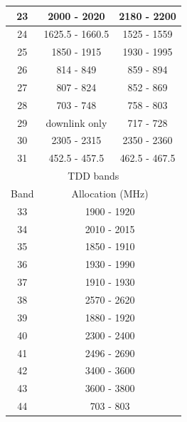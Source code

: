 \begin{table}[H]
\begin{tabular}{|c|c|c|}
         23 & 2000 - 2020 & 2180 - 2200 \\
         \hline
         24 & 1625.5 - 1660.5 & 1525 - 1559\\
         \hline
         25 & 1850 - 1915 & 1930 - 1995\\
         \hline
         26 & 814 - 849 & 859 - 894\\
         \hline
         27 & 807 - 824 & 852 - 869\\
         \hline
         28 & 703 - 748 & 758 - 803\\
         \hline
         29 & downlink only & 717 - 728 \\
         \hline
         30 & 2305 - 2315 & 2350 - 2360\\
         \hline
         31 & 452.5 - 457.5 & 462.5 - 467.5\\
         \hline
         \hline
         \multicolumn{3}{|c|}{TDD bands} \\
         \hline
         Band & \multicolumn{2}{|c|}{Allocation (MHz)}\\
         \hline
         33 & \multicolumn{2}{|c|}{1900 - 1920}\\
         \hline
         34 & \multicolumn{2}{|c|}{2010 - 2015}\\
         \hline
         35 & \multicolumn{2}{|c|}{1850 - 1910 }\\
         \hline
         36 & \multicolumn{2}{|c|}{1930 - 1990 }\\
         \hline
         37 & \multicolumn{2}{|c|}{1910 - 1930 }\\
         \hline
         38 & \multicolumn{2}{|c|}{2570 - 2620}\\
         \hline
         39 & \multicolumn{2}{|c|}{1880 - 1920 }\\
         \hline
         40 & \multicolumn{2}{|c|}{2300 - 2400}\\
         \hline
         41 & \multicolumn{2}{|c|}{2496 - 2690 }\\
         \hline
         42 & \multicolumn{2}{|c|}{3400 - 3600 }\\
         \hline
         43 & \multicolumn{2}{|c|}{3600 - 3800}\\
         \hline
         44 & \multicolumn{2}{|c|}{703 - 803}\\
         \hline
    \end{tabular}
\end{table}

\clearpage
